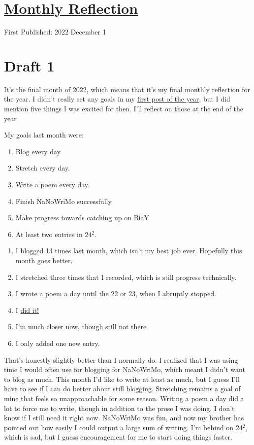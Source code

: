 \documentclass[12pt]{article}[titlepage]
\renewcommand{\,}{\textsuperscript{,}}
\begin{document}
\doublespacing
\section{\href{reflection-november-2022.html}{Monthly Reflection}}
First Published: 2022 December 1

\section{Draft 1}
It's the final month of 2022, which means that it's my final monthly reflection for the year.
I didn't really set any goals in my \href{restarting.html}{first post of the year}, but I did mention five things I was excited for then.
I'll reflect on those at the end of the year

My goals last month were:
\begin{enumerate}
\item Blog every day
\item Stretch every day.
\item Write a poem every day.
\item Finish NaNoWriMo successfully
\item Make progress towards catching up on BiaY
\item At least two entries in 24$^2$.
\end{enumerate}

\begin{enumerate}
\item I blogged 13 times last month, which isn't my best job ever. Hopefully this month goes better.
\item I stretched three times that I recorded, which is still progress technically.
\item I wrote a poem a day until the 22 or 23, when I abruptly stopped.
\item I \href{nanowrimo-4.html}{did it!}
\item I'm much closer now, though still not there
\item I only added one new entry.
\end{enumerate}

That's honestly slightly better than I normally do.
I realized that I was using time I would often use for blogging for NaNoWriMo, which meant I didn't want to blog as much.
This month I'd like to write at least as much, but I guess I'll have to see if I can do better about still blogging.
Stretching remains a goal of mine that feels so unapproachable for some reason.
Writing a poem a day did a lot to force me to write, though in addition to the prose I was doing, I don't know if I still need it right now.
NaNoWriMo was fun, and now my brother has pointed out how easily I could output a large sum of writing.
I'm behind on 24$^2$, which is sad, but I guess encouragement for me to start doing things faster.
\end{document}
